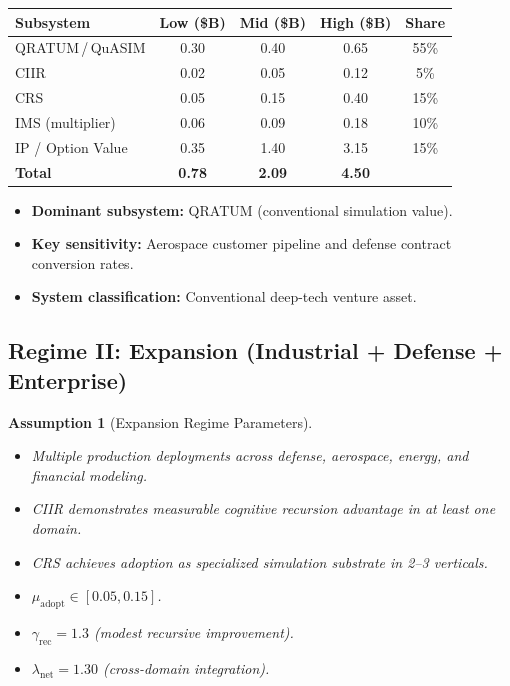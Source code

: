 \documentclass[11pt,a4paper]{article}
\newtheorem{assumption}[definition]{Assumption}
\theoremstyle{remark}
\begin{document}
\begin{center}
\renewcommand{\arraystretch}{1.3}
\begin{tabular}{lcccc}
\toprule
\textbf{Subsystem} & \textbf{Low (\$B)} & \textbf{Mid (\$B)} & \textbf{High (\$B)} & \textbf{Share} \\
\midrule
QRATUM\,/\,QuASIM & 0.30 & 0.40 & 0.65 & 55\% \\
CIIR               & 0.02 & 0.05 & 0.12 & 5\%  \\
CRS                & 0.05 & 0.15 & 0.40 & 15\% \\
IMS (multiplier)   & 0.06 & 0.09 & 0.18 & 10\% \\
\midrule
IP / Option Value  & 0.35 & 1.40 & 3.15 & 15\% \\
\midrule
\textbf{Total}     & \textbf{0.78} & \textbf{2.09} & \textbf{4.50} & \\
\bottomrule
\end{tabular}
\end{center}

\begin{itemize}[nosep]
  \item \textbf{Dominant subsystem:} QRATUM (conventional simulation
        value).
  \item \textbf{Key sensitivity:} Aerospace customer pipeline and
        defense contract conversion rates.
  \item \textbf{System classification:} Conventional deep-tech
        venture asset.
\end{itemize}

\subsection{Regime II: Expansion (Industrial + Defense + Enterprise)}
\label{subsec:expansion}

\begin{assumption}[Expansion Regime Parameters]
\label{ass:expansion}
\begin{itemize}[nosep]
  \item Multiple production deployments across defense, aerospace,
        energy, and financial modeling.
  \item CIIR demonstrates measurable cognitive recursion advantage
        in at least one domain.
  \item CRS achieves adoption as specialized simulation substrate
        in 2--3 verticals.
  \item $\mu_{\mathrm{adopt}} \in [0.05, 0.15]$.
  \item $\gamma_{\mathrm{rec}} = 1.3$ (modest recursive improvement).
  \item $\lambda_{\mathrm{net}} = 1.30$ (cross-domain integration).
\end{itemize}
\end{assumption}
\end{document}

